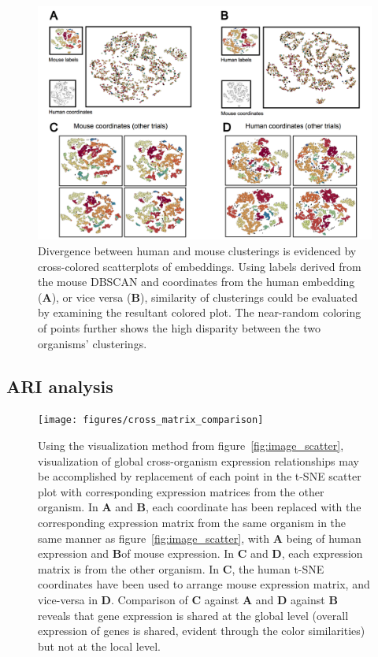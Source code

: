 \documentclass[12pt,oneside,onecolumn,a4paper]{article}
\begin{document}
\begin{figure}[H]
\begin{center}
\includegraphics[width=\columnwidth]{figures/cross_comparison}
\caption{Divergence between human and mouse clusterings is evidenced by cross-colored scatterplots of embeddings. Using labels derived from the mouse DBSCAN and coordinates from the human embedding (\textbf{A}), or vice versa (\textbf{B}), similarity of clusterings could be evaluated by examining the resultant colored plot. The near-random coloring of points further shows the high disparity between the two organisms' clusterings. \label{fig:cross_scatter}%
}
\end{center}
\end{figure}

\subsection{ARI analysis}

\begin{figure}[H]
\begin{center}
\texttt{[image: figures/cross\_matrix\_comparison]}
\caption{Using the visualization method from figure~\ref{fig:image_scatter}, visualization of global cross-organism expression relationships may be accomplished by replacement of each point in the t-SNE scatter plot with corresponding expression matrices from the other organism. In \textbf{A} and \textbf{B}, each coordinate has been replaced with the corresponding expression matrix from the same organism in the same manner as figure~\ref{fig:image_scatter}, with \textbf{A} being of human expression and \textbf{B}of mouse expression. In \textbf{C} and \textbf{D}, each expression matrix is from the other organism. In \textbf{C}, the human t-SNE coordinates have been used to arrange mouse expression matrix, and vice-versa in \textbf{D}. Comparison of \textbf{C} against \textbf{A} and \textbf{D} against \textbf{B} reveals that gene expression is shared at the global level (overall expression of genes is shared, evident through the color similarities) but not at the local level. \label{fig:cross_image_scatter}%
}
\end{center}
\end{figure}
\end{document}
